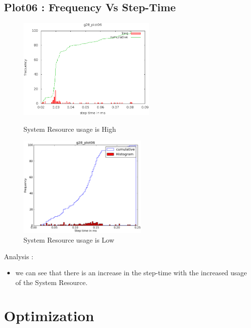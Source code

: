 \documentclass[a4paper,11pt]{article}
\begin{document}
\subsection{Plot06 : Frequency Vs Step-Time}
\begin{figure}[ht]
	\begin{minipage}[ht]{0.5\linewidth}
	\includegraphics[height=50mm]{plots/g28_project_plot06.eps}
	\caption{System Resource usage is High }	
	\end{minipage}	
	\begin{minipage}[ht]{0.5\linewidth}
	\includegraphics[height=50mm]{plots1/g28_project_plot06.eps}
	\caption{System Resource usage is Low }		
	\end{minipage}	
	\end{figure}
		Analysis :
\begin{itemize}
\item we can see that there is an increase in the step-time with the increased usage of the System Resource. 
\end{itemize}
\section{Optimization}
\end{document}
